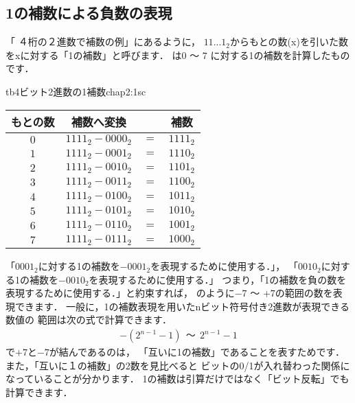 \subsection{1の補数による負数の表現}

「 ４桁の２進数で補数の例」にあるように，
$11...1_2$からもとの数(x)を引いた数をxに対する「1の補数」と呼びます．
は$0$ 〜 $7$ に対する1の補数を計算したものです．

\begin{mytable}{tb}{4ビット2進数の1補数}{chap2:1sc}
{\small\begin{tabular}{ c | r c r}
\hline
\hline
もとの数 & \multicolumn{1}{|c}{補数へ変換} & & \multicolumn{1}{c}{補数} \\
\hline
$0$  & $1111_2 - 0000_2$ & $=$ & $1111_2$ \\
$1$  & $1111_2 - 0001_2$ & $=$ & $1110_2$ \\
$2$  & $1111_2 - 0010_2$ & $=$ & $1101_2$ \\
$3$  & $1111_2 - 0011_2$ & $=$ & $1100_2$ \\
$4$  & $1111_2 - 0100_2$ & $=$ & $1011_2$ \\
$5$  & $1111_2 - 0101_2$ & $=$ & $1010_2$ \\
$6$  & $1111_2 - 0110_2$ & $=$ & $1001_2$ \\
$7$  & $1111_2 - 0111_2$ & $=$ & $1000_2$ \\
\end{tabular}}
\end{mytable}

「$0001_2$に対する1の補数を$-0001_2$を表現するために使用する．」，
「$0010_2$に対する1の補数を$-0010_2$を表現するために使用する．」
つまり，「1の補数を負の数を表現するために使用する．」と約束すれば，
のように$-7$ 〜 $+7$の範囲の数を表現できます．
一般に，1の補数表現を用いたnビット符号付き2進数が表現できる数値の
範囲は次の式で計算できます．
{\small\begin{align*}
-(2^{n-1}-1) ~~ 〜 ~~ 2^{n-1}-1
\end{align*}}
で$+7$と$-7$が結んであるのは，
「互いに1の補数」であることを表すためです．
また，「互いに１の補数」の2数を見比べると
ビットの0/1が入れ替わった関係になっていることが分かります．
1の補数は引算だけではなく「ビット反転」でも計算できます．

